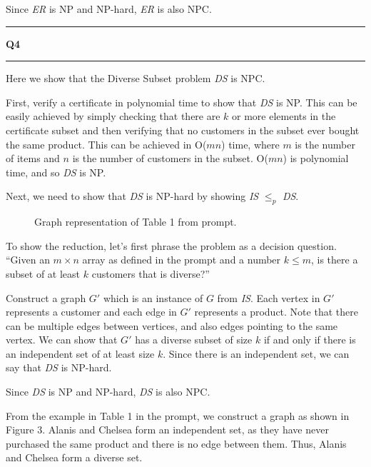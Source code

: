 \documentclass[11pt]{article}
\newcommand\question[2]{\vspace{.25in}\hrule\textbf{#1 #2}\vspace{.5em}\hrule\vspace{.10in}}
\begin{document}
Since \textit{ER} is NP and NP-hard, \textit{ER} is also NPC.

\question{Q4}{}
Here we show that the Diverse Subset problem \textit{DS} is NPC. 

First, verify a certificate in polynomial time to show that \textit{DS} is NP. This can be easily achieved by simply checking that there are $k$ or more elements in the certificate subset and then verifying that no customers in the subset ever bought the same product. This can be achieved in O($mn$) time, where $m$ is the number of items and $n$ is the number of customers in the subset. O($mn$) is polynomial time, and so \textit{DS} is NP.

Next, we need to show that \textit{DS} is NP-hard by showing \textit{IS} $\leq_p$ \textit{DS}.

\begin{figure}[!htpb]
\centering
{}
\caption{Graph representation of Table 1 from prompt.}
\end{figure}

To show the reduction, let's first phrase the problem as a decision question. ``Given an $m \times n$ array as defined in the prompt and a number $k \leq m$, is there a subset of at least $k$ customers that is diverse?''

Construct a graph $G'$ which is an instance of $G$ from \textit{IS}. Each vertex in $G'$ represents a customer and each edge in $G'$ represents a product. Note that there can be multiple edges between vertices, and also edges pointing to the same vertex. We can show that $G'$ has a diverse subset of size $k$ if and only if there is an independent set of at least size $k$. Since there is an independent set, we can say that \textit{DS} is NP-hard.

Since \textit{DS} is NP and NP-hard, \textit{DS} is also NPC.

From the example in Table 1 in the prompt, we construct a graph as shown in Figure 3. Alanis and Chelsea form an independent set, as they have never purchased the same product and there is no edge between them. Thus, Alanis and Chelsea form a diverse set.
\end{document}
